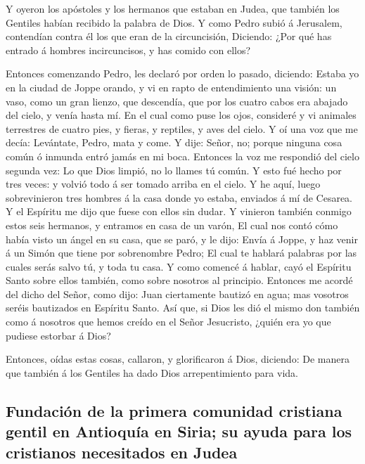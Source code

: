  Y oyeron los apóstoles y los hermanos que estaban en
Judea, que también los Gentiles habían recibido la palabra de Dios.
 Y como Pedro subió á Jerusalem, contendían contra él los
que eran de la circuncisión,  Diciendo: ¿Por qué has
entrado á hombres incircuncisos, y has comido con ellos?

 Entonces comenzando Pedro, les declaró por orden lo
pasado, diciendo:  Estaba yo en la ciudad de Joppe orando,
y vi en rapto de entendimiento una visión: un vaso, como un gran lienzo,
que descendía, que por los cuatro cabos era abajado del cielo, y venía
hasta mí.  En el cual como puse los ojos, consideré y vi
animales terrestres de cuatro pies, y fieras, y reptiles, y aves del
cielo.  Y oí una voz que me decía: Levántate, Pedro, mata
y come.  Y dije: Señor, no; porque ninguna cosa común ó
inmunda entró jamás en mi boca.  Entonces la voz me
respondió del cielo segunda vez: Lo que Dios limpió, no lo llames tú
común.  Y esto fué hecho por tres veces: y volvió todo á
ser tomado arriba en el cielo.  Y he aquí, luego
sobrevinieron tres hombres á la casa donde yo estaba, enviados á mí de
Cesarea.  Y el Espíritu me dijo que fuese con ellos sin
dudar. Y vinieron también conmigo estos seis hermanos, y entramos en
casa de un varón,  El cual nos contó cómo había visto un
ángel en su casa, que se paró, y le dijo: Envía á Joppe, y haz venir á
un Simón que tiene por sobrenombre Pedro;  El cual te
hablará palabras por las cuales serás salvo tú, y toda tu casa.
 Y como comencé á hablar, cayó el Espíritu Santo sobre
ellos también, como sobre nosotros al principio. 
Entonces me acordé del dicho del Señor, como dijo: Juan ciertamente
bautizó en agua; mas vosotros seréis bautizados en Espíritu Santo.
 Así que, si Dios les dió el mismo don también como á
nosotros que hemos creído en el Señor Jesucristo, ¿quién era yo que
pudiese estorbar á Dios?

 Entonces, oídas estas cosas, callaron, y glorificaron á
Dios, diciendo: De manera que también á los Gentiles ha dado Dios
arrepentimiento para vida.

\hypertarget{fundaciuxf3n-de-la-primera-comunidad-cristiana-gentil-en-antioquuxeda-en-siria-su-ayuda-para-los-cristianos-necesitados-en-judea}{%
\subsection{Fundación de la primera comunidad cristiana gentil en
Antioquía en Siria; su ayuda para los cristianos necesitados en
Judea}\label{fundaciuxf3n-de-la-primera-comunidad-cristiana-gentil-en-antioquuxeda-en-siria-su-ayuda-para-los-cristianos-necesitados-en-judea}}

